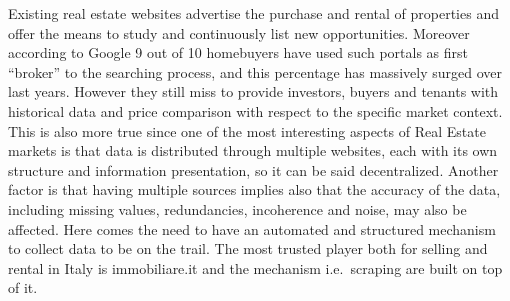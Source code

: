 \documentclass[
  12pt,
  a4paper,
  oneside]{book}
\theoremstyle{definition}
\theoremstyle{definition}
\theoremstyle{definition}
\theoremstyle{remark}
\begin{document}
Existing real estate websites advertise the purchase and rental of properties and offer the means to study and continuously list new opportunities. Moreover according to Google 9 out of 10 homebuyers have used such portals as first ``broker'' to the searching process, and this percentage has massively surged over last years. However they still miss to provide investors, buyers and tenants with historical data and price comparison with respect to the specific market context. This is also more true since one of the most interesting aspects of Real Estate markets is that data is distributed through multiple websites, each with its own structure and information presentation, so it can be said decentralized. Another factor is that having multiple sources implies also that the accuracy of the data, including missing values, redundancies, incoherence and noise, may also be affected. Here comes the need to have an automated and structured mechanism to collect data to be on the trail.
The most trusted player both for selling and rental in Italy is immobiliare.it and the mechanism i.e.~scraping are built on top of it.\\
\end{document}
